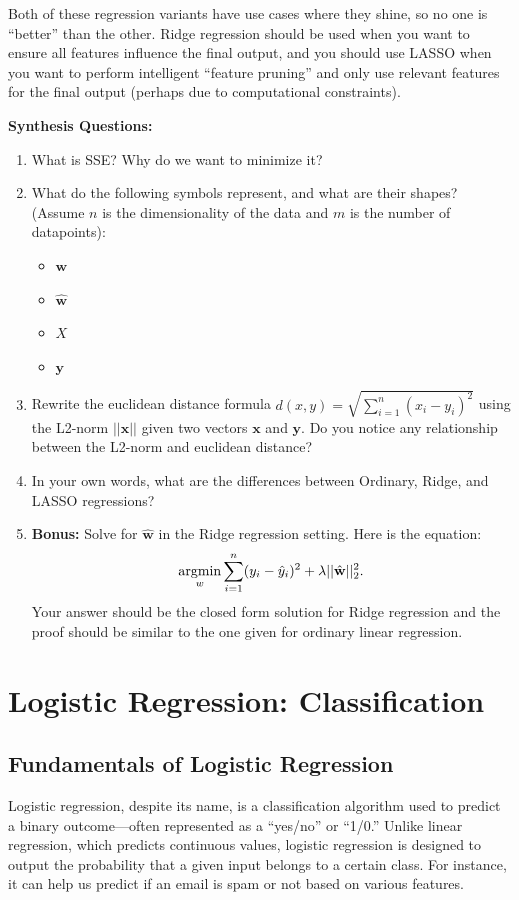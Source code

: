     Both of these regression variants have use cases where they shine, so no one is ``better'' than the other. Ridge regression should be used when you want to ensure all features influence the final output, and you should use LASSO when you want to perform intelligent ``feature pruning'' and only use relevant features for the final output (perhaps due to computational constraints).

\begin{questionbox}
\textbf{Synthesis Questions:}
\begin{enumerate}
    \item What is SSE? Why do we want to minimize it?
    \item What do the following symbols represent, and what are their shapes? (Assume $n$ is the dimensionality of the data and $m$ is the number of datapoints):
    \begin{itemize}
        \item $\textbf{w}$
        \item $\hat{\textbf{w}}$
        \item $X$
        \item $\textbf{y}$
    \end{itemize}
    \item Rewrite the euclidean distance formula $d(x,y) = \sqrt{\sum_{i=1}^n (x_i-y_i)^2}$ using the L2-norm $||\textbf{x}||$ given two vectors $\textbf{x}$ and $\textbf{y}$. Do you notice any relationship between the L2-norm and euclidean distance?
    \item In your own words, what are the differences between Ordinary, Ridge, and LASSO regressions?
    \item \textbf{Bonus:} Solve for $\hat{\textbf{w}}$ in the Ridge regression setting. Here is the equation:
      \[\operatorname*{argmin}_w \sum_{i=1}^n (y_i - \hat{y}_i)^2 + \lambda||\hat{\textbf{w}}||_2^2.\]
      Your answer should be the closed form solution for Ridge regression and the proof should be similar to the one given for ordinary linear regression.
\end{enumerate}
\end{questionbox}

\section{Logistic Regression: Classification}
\subsection{Fundamentals of Logistic Regression}
    \large Logistic regression, despite its name, is a classification algorithm used to predict a binary outcome—often represented as a “yes/no” or “1/0.” Unlike linear regression, which predicts continuous values, logistic regression is designed to output the probability that a given input belongs to a certain class. For instance, it can help us predict if an email is spam or not based on various features.

